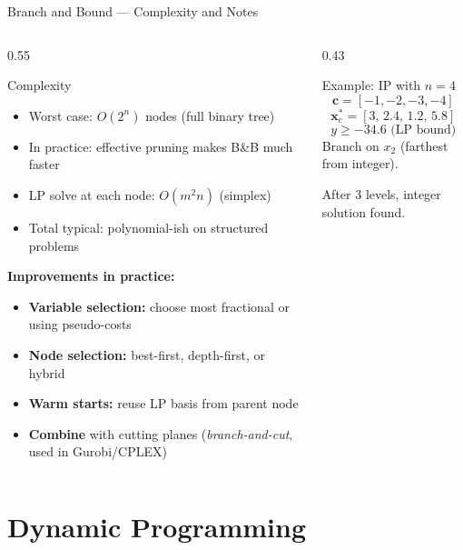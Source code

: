 \documentclass[aspectratio=169,10pt]{beamer}
\newcommand{\bx}{\mathbf{x}}
\newcommand{\bc}{\mathbf{c}}
\begin{document}
\begin{frame}{Branch and Bound --- Complexity and Notes}
  \begin{columns}
    \begin{column}{0.55\textwidth}
      \begin{block}{Complexity}
        \begin{itemize}
          \item Worst case: $O(2^n)$ nodes (full binary tree)
          \item In practice: effective pruning makes B\&B much faster
          \item LP solve at each node: $O(m^2 n)$ (simplex)
          \item Total typical: polynomial-ish on structured problems
        \end{itemize}
      \end{block}

      \textbf{Improvements in practice:}
      \begin{itemize}
        \item \textbf{Variable selection:} choose most fractional or
              using pseudo-costs
        \item \textbf{Node selection:} best-first, depth-first, or hybrid
        \item \textbf{Warm starts:} reuse LP basis from parent node
        \item \textbf{Combine} with cutting planes
              (\emph{branch-and-cut}, used in Gurobi/CPLEX)
      \end{itemize}
    \end{column}
    \begin{column}{0.43\textwidth}
      \begin{block}{Example: IP with $n=4$}
        \[
          \bc = [-1,-2,-3,-4]
        \]
        \[
          \bx^*_c = [3,\,2.4,\,1.2,\,5.8]
        \]
        \[
          y \geq -34.6 \text{ (LP bound)}
        \]
        Branch on $x_2$ (farthest from integer).
        \smallskip

        After 3 levels, integer solution found.
      \end{block}
    \end{column}
  \end{columns}
\end{frame}

\section{Dynamic Programming}
\end{document}
